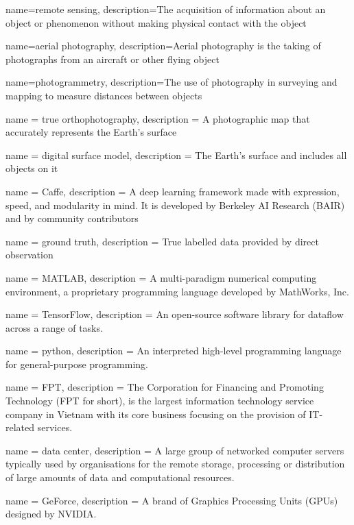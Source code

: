 {
    name=remote sensing,
    description={The acquisition of information about an object or phenomenon
    without making physical contact with the object}
}

{
    name=aerial photography,
    description={Aerial photography is the taking of photographs from an aircraft
    or other flying object}
}

{
    name=photogrammetry,
    description={The use of photography in surveying and mapping to measure
    distances between objects}
}

{
    name = true orthophotography,
    description = {A photographic map that accurately represents the Earth's
    surface}
}

{
    name = digital surface model,
    description = {The Earth's surface and includes all objects on it}
}

{
    name = Caffe,
    description = {A deep learning framework made with expression, speed, and
    modularity in mind. It is developed by Berkeley AI Research (BAIR) and by
    community contributors}
}

{
    name = ground truth,
    description = {True labelled data provided by direct observation}
}

{
    name = MATLAB\textsuperscript{\circledR},
    description = {A multi-paradigm numerical computing environment, a
    proprietary programming language developed by MathWorks, Inc.}
}

{
    name = TensorFlow\texttrademark,
    description = {An open-source software library for dataflow across a range
    of tasks.}
}

{
    name = python\texttrademark,
    description = {An interpreted high-level programming language for
    general-purpose programming.}
}

{
    name = FPT\textsuperscript{\circledR},
    description = {The Corporation for Financing and Promoting Technology (FPT
    for short), is the largest information technology service company in Vietnam
    with its core business focusing on the provision of IT-related services.}
}

{
    name = data center,
    description = {A large group of networked computer servers typically used by
    organisations for the remote storage, processing or distribution of large
    amounts of data and computational resources.}
}

{
    name = GeForce\textsuperscript{\circledR},
    description = {A brand of Graphics Processing Units (GPUs) designed by NVIDIA.}
}
